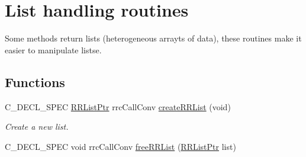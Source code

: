 \hypertarget{group__list}{\section{List handling routines}
\label{group__list}
}


Some methods return lists (heterogeneous arrayts of data), these routines make it easier to manipulate listse.  


\subsection*{Functions}
\begin{DoxyCompactItemize}
\item 
C\-\_\-\-D\-E\-C\-L\-\_\-\-S\-P\-E\-C \hyperlink{rrc__types_8h_a32a8a60ac06858ff3a791672bd2bec73}{R\-R\-List\-Ptr} rrc\-Call\-Conv \hyperlink{group__list_ga0d154a4c5f0aef656c333775638b2b7d}{create\-R\-R\-List} (void)
\begin{DoxyCompactList}\small\item\em Create a new list. \end{DoxyCompactList}\item 
\hypertarget{group__list_gafd22078b804cc5b7e39849fb51c7519a}{C\-\_\-\-D\-E\-C\-L\-\_\-\-S\-P\-E\-C void rrc\-Call\-Conv \hyperlink{group__list_gafd22078b804cc5b7e39849fb51c7519a}{free\-R\-R\-List} (\hyperlink{rrc__types_8h_a32a8a60ac06858ff3a791672bd2bec73}{R\-R\-List\-Ptr} list)}\label{group__list_gafd22078b804cc5b7e39849fb51c7519a}


\end{DoxyCompactItemize}

